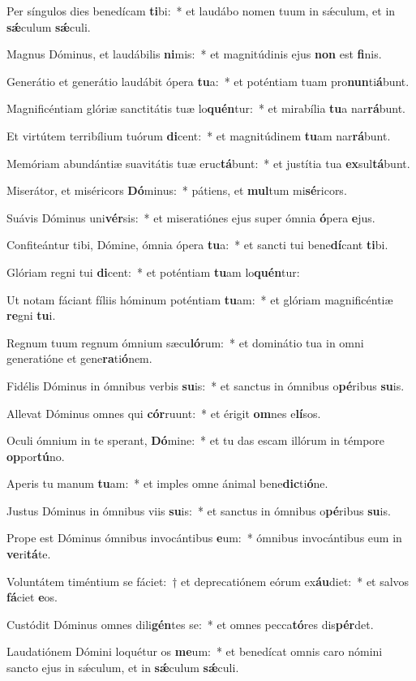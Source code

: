 \item Per síngulos dies benedícam \textbf{ti}bi:~* et laudábo nomen tuum in sǽculum, et in \textbf{sǽ}culum \textbf{sǽ}culi.
\item Magnus Dóminus, et laudábilis \textbf{ni}mis:~* et magnitúdinis ejus \textbf{non} est \textbf{fi}nis.
\item Generátio et generátio laudábit ópera \textbf{tu}a:~* et poténtiam tuam pro\textbf{nun}ti\textbf{á}bunt.
\item Magnificéntiam glóriæ sanctitátis tuæ lo\textbf{quén}tur:~* et mirabília \textbf{tu}a nar\textbf{rá}bunt.
\item Et virtútem terribílium tuórum \textbf{di}cent:~* et magnitúdinem \textbf{tu}am nar\textbf{rá}bunt.
\item Memóriam abundántiæ suavitátis tuæ eruc\textbf{tá}bunt:~* et justítia tua \textbf{ex}sul\textbf{tá}bunt.
\item Miserátor, et miséricors \textbf{Dó}minus:~* pátiens, et \textbf{mul}tum mi\textbf{sé}ricors.
\item Suávis Dóminus uni\textbf{vér}sis:~* et miseratiónes ejus super ómnia \textbf{ó}pera \textbf{e}jus.
\item Confiteántur tibi, Dómine, ómnia ópera \textbf{tu}a:~* et sancti tui bene\textbf{dí}cant \textbf{ti}bi.
\item Glóriam regni tui \textbf{di}cent:~* et poténtiam \textbf{tu}am lo\textbf{quén}tur:
\item Ut notam fáciant fíliis hóminum poténtiam \textbf{tu}am:~* et glóriam magnificéntiæ \textbf{re}gni \textbf{tu}i.
\item Regnum tuum regnum ómnium sæcu\textbf{ló}rum:~* et dominátio tua in omni generatióne et gene\textbf{ra}ti\textbf{ó}nem.
\item Fidélis Dóminus in ómnibus verbis \textbf{su}is:~* et sanctus in ómnibus o\textbf{pé}ribus \textbf{su}is.
\item Allevat Dóminus omnes qui \textbf{cór}ruunt:~* et érigit \textbf{om}nes e\textbf{lí}sos.
\item Oculi ómnium in te sperant, \textbf{Dó}mine:~* et tu das escam illórum in témpore \textbf{op}por\textbf{tú}no.
\item Aperis tu manum \textbf{tu}am:~* et imples omne ánimal bene\textbf{dic}ti\textbf{ó}ne.
\item Justus Dóminus in ómnibus viis \textbf{su}is:~* et sanctus in ómnibus o\textbf{pé}ribus \textbf{su}is.
\item Prope est Dóminus ómnibus invocántibus \textbf{e}um:~* ómnibus invocántibus eum in \textbf{ve}ri\textbf{tá}te.
\item Voluntátem timéntium se fáciet:~† et deprecatiónem eórum ex\textbf{áu}diet:~* et salvos \textbf{fá}ciet \textbf{e}os.
\item Custódit Dóminus omnes dili\textbf{gén}tes se:~* et omnes pecca\textbf{tó}res dis\textbf{pér}det.
\item Laudatiónem Dómini loquétur os \textbf{me}um:~* et benedícat omnis caro nómini sancto ejus in sǽculum, et in \textbf{sǽ}culum \textbf{sǽ}culi.
